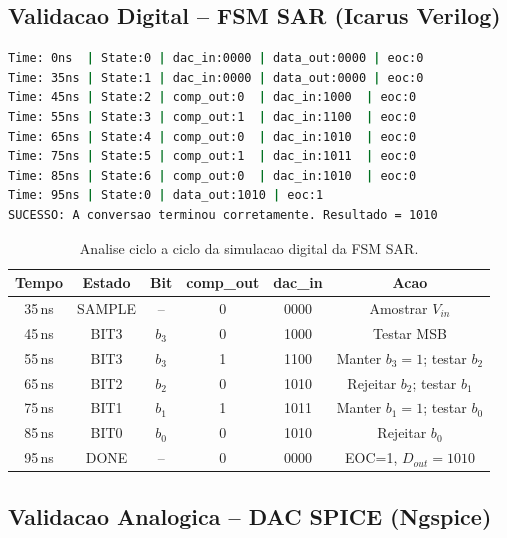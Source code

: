 \documentclass[12pt, a4paper]{article}
\begin{document}
\subsection{Validacao Digital -- FSM SAR (Icarus Verilog)}

\begin{lstlisting}[language=bash, caption={Log completo da simulacao RTL -- Icarus Verilog.}]
Time: 0ns  | State:0 | dac_in:0000 | data_out:0000 | eoc:0
Time: 35ns | State:1 | dac_in:0000 | data_out:0000 | eoc:0
Time: 45ns | State:2 | comp_out:0  | dac_in:1000  | eoc:0
Time: 55ns | State:3 | comp_out:1  | dac_in:1100  | eoc:0
Time: 65ns | State:4 | comp_out:0  | dac_in:1010  | eoc:0
Time: 75ns | State:5 | comp_out:1  | dac_in:1011  | eoc:0
Time: 85ns | State:6 | comp_out:0  | dac_in:1010  | eoc:0
Time: 95ns | State:0 | data_out:1010 | eoc:1
SUCESSO: A conversao terminou corretamente. Resultado = 1010
\end{lstlisting}

\begin{table}[h!]
\centering
\caption{Analise ciclo a ciclo da simulacao digital da FSM SAR.}
\label{tab:sim_digital}
\begin{tabular}{cccccc}
\toprule
\textbf{Tempo} & \textbf{Estado} & \textbf{Bit} & \textbf{comp\_out} & \textbf{dac\_in} & \textbf{Acao} \\
\midrule
35\,ns & SAMPLE & --   & 0 & 0000 & Amostrar $V_{in}$ \\
45\,ns & BIT3   & $b_3$ & 0 & 1000 & Testar MSB \\
55\,ns & BIT3   & $b_3$ & 1 & 1100 & Manter $b_3=1$; testar $b_2$ \\
65\,ns & BIT2   & $b_2$ & 0 & 1010 & Rejeitar $b_2$; testar $b_1$ \\
75\,ns & BIT1   & $b_1$ & 1 & 1011 & Manter $b_1=1$; testar $b_0$ \\
85\,ns & BIT0   & $b_0$ & 0 & 1010 & Rejeitar $b_0$ \\
95\,ns & DONE   & --   & 0 & 0000 & EOC=1, $D_{out}=1010$ \\
\bottomrule
\end{tabular}
\end{table}

\subsection{Validacao Analogica -- DAC SPICE (Ngspice)}
\end{document}
